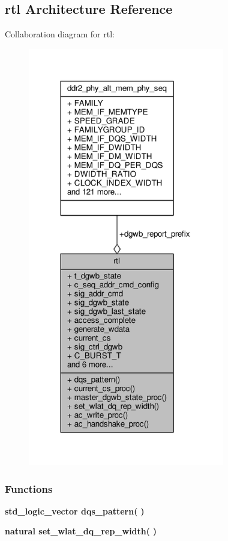 \subsection{rtl Architecture Reference}
\label{classddr2__phy__alt__mem__phy__dgwb_1_1rtl}


Collaboration diagram for rtl\+:\nopagebreak
\begin{figure}[H]
\begin{center}
\leavevmode
\includegraphics[width=243pt]{d0/d0e/classddr2__phy__alt__mem__phy__dgwb_1_1rtl__coll__graph}
\end{center}
\end{figure}
\subsubsection*{Functions}
 \begin{DoxyCompactItemize}
\item 
{\bfseries {\bfseries \textcolor{comment}{std\+\_\+logic\+\_\+vector}\textcolor{vhdlchar}{ }}} {\bf dqs\+\_\+pattern}{\bfseries  ( }{\bfseries  )} 
\item 
{\bfseries {\bfseries \textcolor{comment}{natural}\textcolor{vhdlchar}{ }}} {\bf set\+\_\+wlat\+\_\+dq\+\_\+rep\+\_\+width}{\bfseries  ( }{\bfseries  )} 
\end{DoxyCompactItemize}
